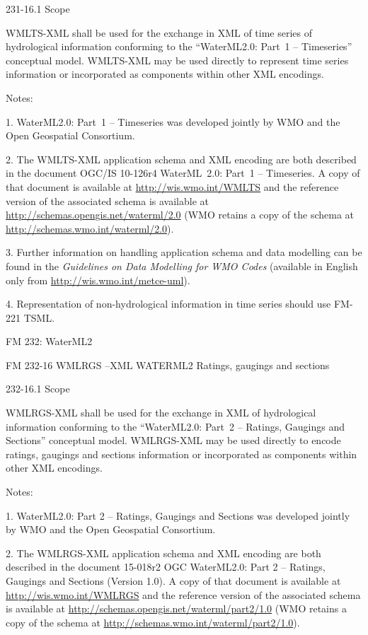 231-16.1 Scope

WMLTS-XML shall be used for the exchange in XML of time series of hydrological information conforming to the ``WaterML2.0: Part~1 -- Timeseries'' conceptual model. WMLTS-XML may be used directly to represent time series information or incorporated as components within other XML encodings.

Notes:

1. WaterML2.0: Part~1 -- Timeseries was developed jointly by WMO and the Open Geospatial Consortium.

2. The WMLTS-XML application schema and XML encoding are both described in the document OGC/IS 10-126r4 WaterML~2.0: Part~1 -- Timeseries. A copy of that document is available at \url{http://wis.wmo.int/WMLTS} and the reference version of the associated schema is available at \url{http://schemas.opengis.net/waterml/2.0} (WMO retains a copy of the schema at \url{http://schemas.wmo.int/waterml/2.0}).

3. Further information on handling application schema and data modelling can be found in the \emph{Guidelines on Data Modelling for WMO Codes} (available in English only from \url{http://wis.wmo.int/metce-uml}).

4. Representation of non-hydrological information in time series should use FM-221 TSML.

FM 232: WaterML2

FM 232-16 WMLRGS --XML WATERML2 Ratings, gaugings and sections

232-16.1 Scope

WMLRGS-XML shall be used for the exchange in XML of hydrological information conforming to the ``WaterML2.0: Part~2 -- Ratings, Gaugings and Sections'' conceptual model. WMLRGS-XML may be used directly to encode ratings, gaugings and sections information or incorporated as components within other XML encodings.

Notes:

1. WaterML2.0: Part 2 -- Ratings, Gaugings and Sections was developed jointly by WMO and the Open Geospatial Consortium.

2. The WMLRGS-XML application schema and XML encoding are both described in the document 15-018r2 OGC WaterML2.0: Part 2 -- Ratings, Gaugings and Sections (Version 1.0). A copy of that document is available at \url{http://wis.wmo.int/WMLRGS} and the reference version of the associated schema is available at \url{http://schemas.opengis.net/waterml/part2/1.0} (WMO retains a copy of the schema at \url{http://schemas.wmo.int/waterml/part2/1.0}).

